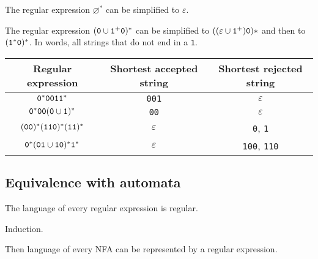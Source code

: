 \documentclass{notes}
\begin{document}
\begin{eg}
  The regular expression $\varnothing^*$ can be simplified to $\varepsilon$.
\end{eg}

\begin{eg}
  The regular expression $(\verb~0~ \cup \verb~1~^+ \verb~0~)^*$ can be simplified to $((\varepsilon \cup \verb~1~^+) \verb~0~)*$ and then to $(\verb~1~^* \verb~0~)^*$.
  In words, all strings that do not end in a \verb~1~.
\end{eg}

\begin{eg}
  \begin{center}
    \begin{tabular}{c|c|c}
      Regular expression & Shortest accepted string & Shortest rejected string \\ 
      \hline
      $\verb~0~^* \verb~0011~^*$ & \verb~001~ & $\varepsilon$ \\ 
      $\verb~0~^* \verb~00~ (\verb~0~ \cup \verb~1~)^*$ & \verb~00~ & $\varepsilon$ \\ 
      $(\verb~00~)^* (\verb~110~)^* (\verb~11~)^*$ & $\varepsilon$ & \verb~0~, \verb~1~ \\ 
      $\verb~0~^* (\verb~01~ \cup \verb~10~)^* \verb~1~^*$ & $\varepsilon$ & \verb~100~, \verb~110~
    \end{tabular}
  \end{center}
\end{eg}

\subsection{Equivalence with automata}

\begin{thm}
  The language of every regular expression is regular.
\end{thm}

\begin{prf}
  Induction.
\end{prf}

\begin{thm}
  Then language of every NFA can be represented by a regular expression.
\end{thm}
\end{document}
